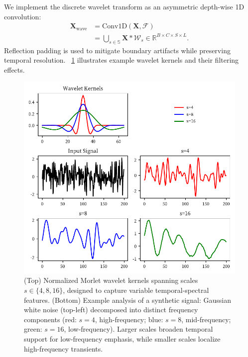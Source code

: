 \documentclass[conference]{IEEEtran}
\begin{document}
We implement the discrete wavelet transform as an asymmetric depth-wise 1D convolution:
\begin{equation}
    \begin{aligned}
        \mathbf{X}_{\text{wave}} &= \text{Conv1D}(\mathbf{X}, \mathcal{F}) \\
        &= \bigcup_{s\in\mathbb{S}} \mathbf{X}\ast \mathcal{W}_s \in \mathbb{R}^{B\times C\times S\times L}.
    \end{aligned}
\end{equation}
Reflection padding is used to mitigate boundary artifacts while preserving temporal resolution. \figurename~\ref{fig:wavelet-transform} illustrates example wavelet kernels and their filtering effects.

\begin{figure}[tb]
    \centering
    \includegraphics[width=0.9\linewidth]{wavelet-transform.pdf}
    \caption{(Top) Normalized Morlet wavelet kernels spanning scales \( s \in \{4, 8, 16\} \), designed to capture variable temporal-spectral features. (Bottom) Example analysis of a synthetic signal: Gaussian white noise (top-left) decomposed into distinct frequency components (red: \( s=4 \), high-frequency; blue: \( s=8 \), mid-frequency; green: \( s=16 \), low-frequency). Larger scales broaden temporal support for low-frequency emphasis, while smaller scales localize high-frequency transients.
    }

    \label{fig:wavelet-transform}
\end{figure}
\end{document}
